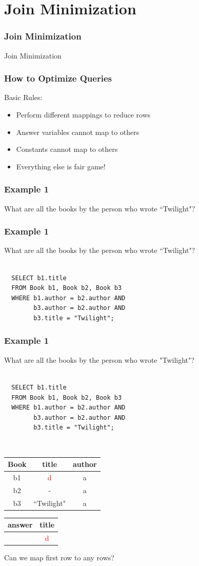 \documentclass{beamer}
\begin{document}
\section{Join Minimization}
\begin{frame}
  \frametitle{Join Minimization}
  Join Minimization
\end{frame}

\begin{frame}
  \frametitle{How to Optimize Queries}
  Basic Rules:
  \begin{itemize}
    \item Perform different mappings to reduce rows
    \item Answer variables cannot map to others
    \item Constants cannot map to others
    \item Everything else is fair game!
  \end{itemize}
\end{frame}

\begin{frame}
  \frametitle{Example 1}
  What are all the books by the person who wrote ``Twilight"?
\end{frame}

\begin{frame}[fragile]
  \frametitle{Example 1}
  What are all the books by the person who wrote ``Twilight"?\\
  \hfill \\
\begin{verbatim} 
  SELECT b1.title
  FROM Book b1, Book b2, Book b3
  WHERE b1.author = b2.author AND
        b3.author = b2.author AND
        b3.title = "Twilight";
\end{verbatim}

\end{frame}

\begin{frame}[fragile]
  \frametitle{Example 1}
  What are all the books by the person who wrote "Twilight"?\\
  \hfill \\
\begin{verbatim} 
  SELECT b1.title
  FROM Book b1, Book b2, Book b3
  WHERE b1.author = b2.author AND
        b3.author = b2.author AND
        b3.title = "Twilight";
\end{verbatim}
  \hfill \\
  \begin{tabular}{ c | c c }
  Book & title & author \\
  \hline
   b1 & \textcolor{red}{d} & a \\
   b2 & -         & a \\
   b3 & ``Twilight" & a \\
  \end{tabular}
  \begin{tabular}{ c | c}
  answer & title \\
  \hline
   & \textcolor{red}{d}\\
  \end{tabular}

  Can we map first row to any rows?
\end{frame}
\end{document}
